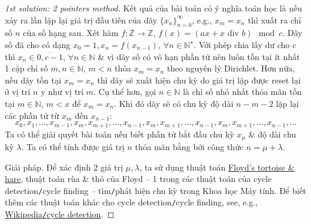 \documentclass{article}
\begin{document}
\begin{proof}[1st solution: 2 pointers method]
    Kết quả của bài toán có ý nghĩa toán học là nếu xảy ra lần lặp lại giá trị đầu tiên của dãy $\{x_n\}_{n=0}^\infty$, e.g., $x_m = x_n$ thì xuất ra chỉ số $n$ của số hạng sau. Xét hàm $f:\mathbb{Z}\to\mathbb{Z}$, $f(x) = (ax + x\mbox{ div } b)\mod c$. Dãy số đã cho có dạng $x_0 = 1,x_n = f(x_{n-1})$, $\forall n\in\mathbb{N}^\star$. Với phép chia lấy dư cho $c$ thì $x_n\in\overline{0,c-1}$, $\forall n\in\mathbb{N}$ \& vì dãy số có vô hạn phần tử nên luôn tồn tại ít nhất 1 cặp chỉ số $m,n\in\mathbb{N}$, $m < n$ thỏa $x_m = x_n$ theo nguyên lý Dirichlet. Hơn nữa, nếu dãy tồn tại $x_m = x_n$ thì dãy sẽ xuất hiện chu kỳ do giá trị lặp được reset lại ở vị trí $n$ y như vị trí $m$. Cụ thể hơn, gọi $n\in\mathbb{N}$ là chỉ số nhỏ nhất thỏa mãn tồn tại $m\in\mathbb{N}$, $m < x$ để $x_m = x_n$. Khi đó dãy sẽ có chu kỳ độ dài $n - m - 2$ lặp lại các phần tử từ $x_m$ đến $x_{n-1}$:
    \begin{equation*}
        x_0,x_1,\ldots,x_{m-1},x_m,x_{m+1},\ldots,x_{n-1},x_m,x_{m+1},\ldots,x_{n-1},x_m,x_{m+1},\ldots,x_{n-1},\ldots
    \end{equation*}
    Ta có thể giải quyết bài toán nếu biết phần tử bắt đầu chu kỳ $x_\mu$ \& độ dài chu kỳ $\lambda$. Ta có thể tính được giá trị $n$ thỏa mãn bằng bởi công thức $n = \mu + \lambda$.
    \item {\sf Giải pháp.} Để xác định 2 giá trị $\mu,\lambda$, ta sử dụng thuật toán \href{https://en.wikipedia.org/wiki/Cycle_detection#Floyd's_tortoise_and_hare}{Floyd's tortoise \& hare}, thuật toán rùa \& thỏ của Floyd -- 1 trong các thuật toán của cycle detection{\tt/}cycle finding -- tìm{\tt/}phát hiện chu kỳ trong Khoa học Máy tính. Để biết thêm các thuật toán khác cho cycle detection{\tt/}cycle finding, see, e.g., \href{https://en.wikipedia.org/wiki/Cycle_detection}{Wikipedia{\tt/}cycle detection}.


\end{proof}
\end{document}
